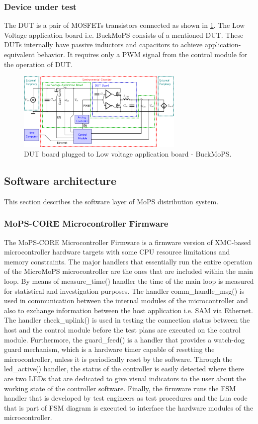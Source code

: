 \subsubsection{Device under test}\label{sec:DUT}
The DUT is a pair of \glspl{MOSFET} transistors connected as shown in \cref{fig:BuckMoPS}. 
The Low Voltage application board i.e. BuckMoPS consists of a mentioned \acrshort{DUT}. 
These \glspl{DUT} internally have passive inductors and capacitors to achieve application-equivalent behavior. 
It requires only a \gls{PWM} signal from the control module for the operation of \gls{DUT}.	
\begin{figure}
		\centering
		\includegraphics[trim=1370 600 750 100, clip, width=80mm]{images/LV_module_2.png}
		\caption{DUT board plugged to Low voltage application board - BuckMoPS.}
		\label{fig:BuckMoPS}
\end{figure}

\subsection{Software architecture}
This section describes the software layer of MoPS distribution system.

\subsubsection{MoPS-CORE Microcontroller Firmware}\label{sec:CORE}
The MoPS-CORE Microcontroller Firmware is a firmware version of XMC-based microcontroller hardware targets with some CPU resource limitations and memory constraints.
The major handlers that essentially run the entire operation of the MicroMoPS microcontroller are the ones that are included within the main loop. 
By means of measure\_time() handler the time of the main loop is measured for statistical and investigation purposes. 
The handler comm\_handle\_msg() is used in communication between the internal modules of the microcontroller and also to exchange information between the host application i.e. \acrshort{SAM} via Ethernet. 
The handler check\_uplink() is used in testing the connection status between the host and the control module before the test plans are executed on the control module.
Furthermore, the guard\_feed() is a handler that provides a watch-dog guard mechanism, which is a hardware timer capable of resetting the microcontroller, unless it is periodically reset by the software. 
Through the led\_active() handler, the status of the controller is easily detected where there are two \glspl{LED} that are dedicated to give visual indicators to the user about the working state of the controller software. 
Finally, the firmware runs the FSM handler that is developed by test engineers as test procedures and the Lua code that is part of \gls{FSM} diagram is executed to interface the hardware modules of the microcontroller.

